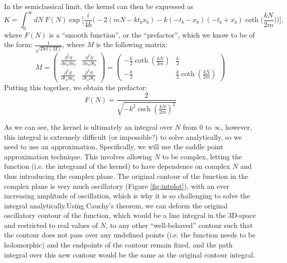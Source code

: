 \documentclass[12pt]{revtex4}
\DeclareMathOperator{\csch}{csch}
\begin{document}
In the semiclassical limit, the kernel can then be expressed as 
\[ K=\int_{0}^{\infty} dN\ F(N) \exp \Bigg[\frac{i}{4 \hbar} \Bigg(-2 (m N - k t_b x_b) - k (-t_b - x_b) (-t_b + x_b) \coth\bigg(\frac{k N}{2 m}\bigg)\Bigg)\Bigg],\]
where $F(N)$ is a ``smooth function'', or the ``prefactor'', which we know to be of the form: $\frac{1}{\sqrt{Det(M)}}$, where $M$ is the following matrix:
\[ M=\begin{pmatrix}
\frac{\partial^2 S}{\partial x_a \partial x_b} & \frac{\partial^2 S}{\partial x_a \partial t_b} \\ 
\frac{\partial^2 S}{\partial t_a \partial x_b} & \frac{\partial^2 S}{\partial t_a \partial t_b} 
\end{pmatrix} = 
\begin{pmatrix}
-\frac{k}{2}  \coth(\frac{k N}{2 m}) & \frac{k}{2} \\ 
-\frac{k}{2} & \frac{k}{2} \coth(\frac{k N}{2 m})
\end{pmatrix} \]
Putting this together, we obtain the prefactor:
\[ F(N)=\frac{2}{\sqrt{-k^2 \csch(\frac{k N}{2 m})^2}} \]

As we can see, the kernel is ultimately an integral over $N$ from 0 to $\infty$, however, this integral is extremely difficult (or impossible?) to solve analytically, so we need to use an approximation. Specifically, we will use the saddle point approximation technique. This involves allowing $N$ to be complex, letting the function (i.e. the integrand of the kernel) to have dependence on complex $N$ and thus introducing the complex plane. The original contour of the function in the complex plane is very much oscillatory (Figure \ref{fig:intplot}), with an ever increasing amplitude of oscillation, which is why it is so challenging to solve the integral analytically.Using Cauchy's theorem, we can deform the original oscillatory contour of the function, which would be a line integral in the 3D-space and restricted to real values of $N$, to any other ``well-behaved'' contour such that the contour does not pass over any undefined points (i.e. the function needs to be holomorphic) and the endpoints of the contour remain fixed, and the path integral over this new contour would be the same as the original contour integral.
\end{document}
